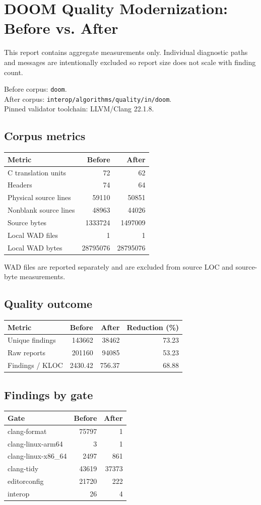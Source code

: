 \documentclass[10pt]{article}
\begin{document}
\section*{DOOM Quality Modernization: Before vs. After}
This report contains aggregate measurements only. Individual diagnostic paths and messages are intentionally excluded so report size does not scale with finding count.

Before corpus: \texttt{doom}.\\
After corpus: \texttt{interop/algorithms/quality/in/doom}.\\
Pinned validator toolchain: LLVM/Clang 22.1.8.
\subsection*{Corpus metrics}
\begin{tabular}{lrr}
\toprule Metric & Before & After \\
\midrule
C translation units & 72 & 62 \\
Headers & 74 & 64 \\
Physical source lines & 59110 & 50851 \\
Nonblank source lines & 48963 & 44026 \\
Source bytes & 1333724 & 1497009 \\
Local WAD files & 1 & 1 \\
Local WAD bytes & 28795076 & 28795076 \\
\bottomrule
\end{tabular}

WAD files are reported separately and are excluded from source LOC and source-byte measurements.
\subsection*{Quality outcome}
\begin{tabular}{lrrr}
\toprule Metric & Before & After & Reduction (\%) \\
\midrule
Unique findings & 143662 & 38462 & 73.23 \\
Raw reports & 201160 & 94085 & 53.23 \\
Findings / KLOC & 2430.42 & 756.37 & 68.88 \\
\bottomrule
\end{tabular}
\subsection*{Findings by gate}
\begin{tabular}{lrr}
\toprule Gate & Before & After \\
\midrule
clang-format & 75797 & 1 \\
clang-linux-arm64 & 3 & 1 \\
clang-linux-x86\_64 & 2497 & 861 \\
clang-tidy & 43619 & 37373 \\
editorconfig & 21720 & 222 \\
interop & 26 & 4 \\
\bottomrule
\end{tabular}
\end{document}
